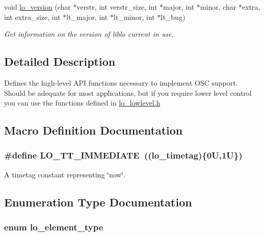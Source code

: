 \begin{DoxyCompactItemize}
void \hyperlink{group__liblo_gad9fa9a716b9df6b60357ea05e6c5f87b}{lo\+\_\+version} (char $\ast$verstr, int verstr\+\_\+size, int $\ast$major, int $\ast$minor, char $\ast$extra, int extra\+\_\+size, int $\ast$lt\+\_\+major, int $\ast$lt\+\_\+minor, int $\ast$lt\+\_\+bug)
\begin{DoxyCompactList}\small\item\em Get information on the version of liblo current in use. \end{DoxyCompactList}\end{DoxyCompactItemize}


\subsection{Detailed Description}
Defines the high-\/level A\+P\+I functions necessary to implement O\+S\+C support. Should be adequate for most applications, but if you require lower level control you can use the functions defined in \hyperlink{lo__lowlevel_8h}{lo\+\_\+lowlevel.\+h} 

\subsection{Macro Definition Documentation}
\hypertarget{group__liblo_gafa8cfc08b763b0c039fb64a73c4c77da}{
\subsubsection[{L\+O\+\_\+\+T\+T\+\_\+\+I\+M\+M\+E\+D\+I\+A\+T\+E}]{\setlength{\rightskip}{0pt plus 5cm}\#define L\+O\+\_\+\+T\+T\+\_\+\+I\+M\+M\+E\+D\+I\+A\+T\+E~(({\bf lo\+\_\+timetag})\{0\+U,1\+U\})}}\label{group__liblo_gafa8cfc08b763b0c039fb64a73c4c77da}


A timetag constant representing \char`\"{}now\char`\"{}. 



\subsection{Enumeration Type Documentation}
\hypertarget{group__liblo_ga08432d01f2b8f4a32ffa58992a821f28}{
\subsubsection[{lo\+\_\+element\+\_\+type}]{\setlength{\rightskip}{0pt plus 5cm}enum {\bf lo\+\_\+element\+\_\+type}}}\label{group__liblo_ga08432d01f2b8f4a32ffa58992a821f28}


